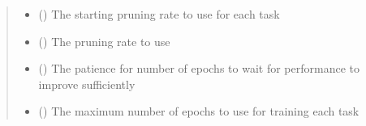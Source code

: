\documentclass[letterpaper,10pt,english]{sphinxmanual}
\begin{document}
\begin{fulllineitems}
\begin{quote}
\begin{description}
\begin{itemize}
\item {} 
\sphinxAtStartPar
{} (\sphinxstyleliteralemphasis{\sphinxupquote{ (}}\sphinxstyleliteralemphasis{\sphinxupquote{)}}) \textendash{} The starting pruning rate to use for each task

\item {} 
\sphinxAtStartPar
{} (\sphinxstyleliteralemphasis{\sphinxupquote{ (}}\sphinxstyleliteralemphasis{\sphinxupquote{ {[}}}\sphinxstyleliteralemphasis{\sphinxupquote{, }}\sphinxstyleliteralemphasis{\sphinxupquote{, }}\sphinxstyleliteralemphasis{\sphinxupquote{, }}\sphinxstyleliteralemphasis{\sphinxupquote{{]}}}\sphinxstyleliteralemphasis{\sphinxupquote{)}}) \textendash{} The pruning rate to use

\item {} 
\sphinxAtStartPar
{} (\sphinxstyleliteralemphasis{\sphinxupquote{ (}}\sphinxstyleliteralemphasis{\sphinxupquote{)}}) \textendash{} The patience for number of epochs to wait for performance to improve sufficiently

\item {} 
\sphinxAtStartPar
{} (\sphinxstyleliteralemphasis{\sphinxupquote{ (}}\sphinxstyleliteralemphasis{\sphinxupquote{)}}) \textendash{} The maximum number of epochs to use for training each task

\end{itemize}

\end{description}\end{quote}

\end{fulllineitems}
\end{document}
